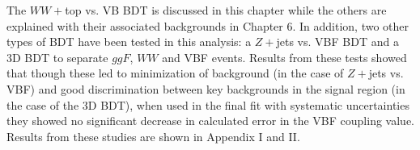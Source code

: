 The $WW+$top vs. VB BDT is discussed in this chapter while the others are explained with their associated backgrounds in Chapter 6. In addition, two other types of BDT have been tested in this analysis: a $Z+$jets vs. VBF BDT and a 3D BDT to separate $ggF$, $WW$ and VBF events. Results from these tests showed that though these led to minimization of background (in the case of $Z+$jets vs. VBF) and good discrimination between key backgrounds in the signal region (in the case of the 3D BDT), when used in the final fit with systematic uncertainties they showed no significant decrease in calculated error in the VBF coupling value. Results from these studies are shown in Appendix I and II.
\begin{table}[h!]
\centering
{}
\caption{Each background and its relative size of in SR (after all cuts), estimation method, and generator.}
\label{tab:bkgsum}
\end{table}

